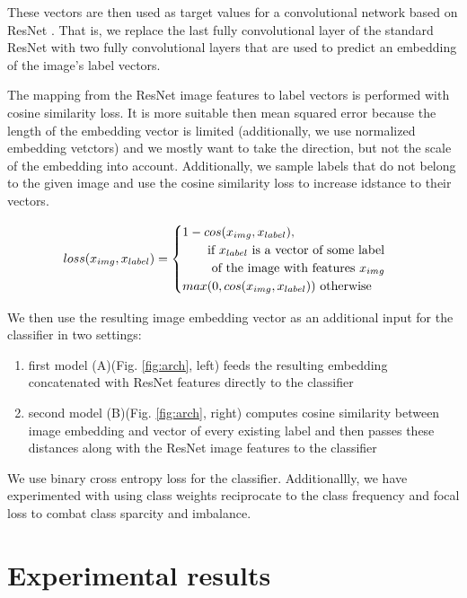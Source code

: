 \documentclass[10pt,twocolumn,letterpaper]{article}
\begin{document}
\par These vectors are then used as target values for a convolutional network based on ResNet \cite{he2015deep}. That is, we replace the last fully convolutional layer of the standard ResNet with two fully convolutional layers that are used to predict an embedding of the image's label vectors.
\par The mapping from the ResNet image features to label vectors is performed with cosine similarity loss. It is more suitable then mean squared error because the length of the embedding vector is limited (additionally, we use normalized embedding vetctors) and we mostly want to take the direction, but not the scale of the embedding into account. Additionally, we sample labels that do not belong to the given image and use the cosine similarity loss to increase idstance to their vectors.

\begin{align*}
loss(x_{img}, x_{label}) =
\begin{cases}
1-cos(x_{img}, x_{label}), \\ \text{\qquad if $x_{label}$ is a vector of some label  } \\ \text{ \qquad of the image with features $x_{img}$}\\
max(0, cos(x_{img}, x_{label})) \text{ otherwise}
\end{cases}
\end{align*}
\par We then use the resulting image embedding vector as an additional input for the classifier in two settings:
\begin{enumerate}
	\item first model (A)(Fig. \ref{fig:arch}, left) feeds the resulting embedding concatenated with ResNet features directly to the classifier
	\item second model (B)(Fig. \ref{fig:arch}, right) computes cosine similarity between image embedding and vector of every existing label and then passes these distances along with the ResNet image features to the classifier
\end{enumerate}
\par We use binary cross entropy loss for the classifier. Additionallly, we have experimented with using class weights reciprocate to the class frequency and focal loss \cite{lin2017focal} to combat class sparcity and imbalance.

\section{Experimental results}
\end{document}
